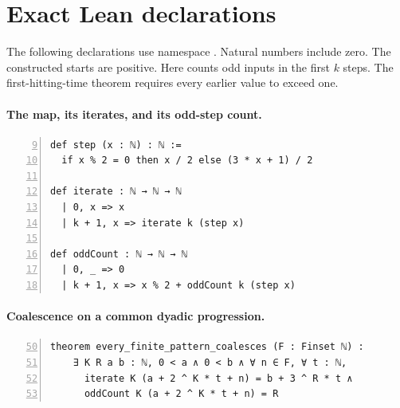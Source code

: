 \section{Exact Lean declarations}\label{app:lean}
The following declarations use namespace
.
Natural numbers include zero. The constructed starts are positive.
Here  counts odd inputs in the first $k$ steps.
The first-hitting-time theorem requires every earlier value to
exceed one.

\noindent\begin{minipage}{\linewidth}
\paragraph{The map, its iterates, and its odd-step count.}\mbox{}\par
{}\par
\begin{Verbatim}[formatcom=\leanappendixfont,fontsize=\scriptsize,numbers=left,firstnumber=9,numbersep=5pt,xleftmargin=18pt]
def step (x : ℕ) : ℕ :=
  if x % 2 = 0 then x / 2 else (3 * x + 1) / 2

def iterate : ℕ → ℕ → ℕ
  | 0, x => x
  | k + 1, x => iterate k (step x)

def oddCount : ℕ → ℕ → ℕ
  | 0, _ => 0
  | k + 1, x => x % 2 + oddCount k (step x)
\end{Verbatim}
\end{minipage}\par\medskip

\noindent\begin{minipage}{\linewidth}
\paragraph{Coalescence on a common dyadic progression.}\mbox{}\par
{}\par
\begin{Verbatim}[formatcom=\leanappendixfont,fontsize=\scriptsize,numbers=left,firstnumber=50,numbersep=5pt,xleftmargin=18pt]
theorem every_finite_pattern_coalesces (F : Finset ℕ) :
    ∃ K R a b : ℕ, 0 < a ∧ 0 < b ∧ ∀ n ∈ F, ∀ t : ℕ,
      iterate K (a + 2 ^ K * t + n) = b + 3 ^ R * t ∧
      oddCount K (a + 2 ^ K * t + n) = R
\end{Verbatim}
\end{minipage}\par\medskip

